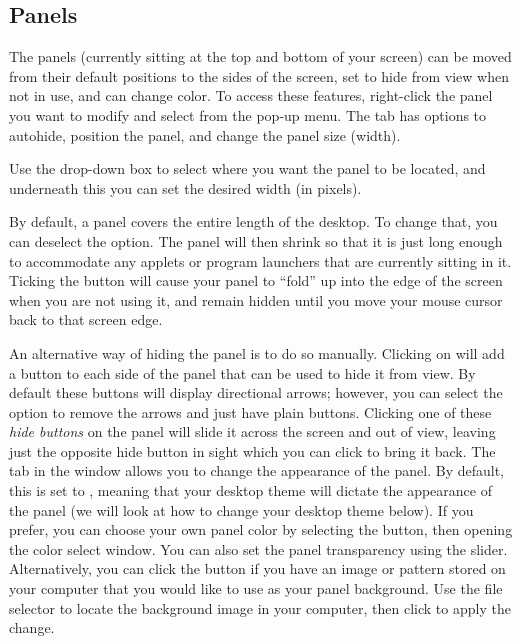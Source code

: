 \subsection{Panels}
The panels (currently sitting at the top and bottom of your screen) can be moved from their default positions to the sides of the screen, set to hide from view when not in use, and can change color. To access these features, right-click the panel you want to modify and select 
from the pop-up menu. The  tab has options to autohide, position the panel, and change the panel size (width). 

Use the  drop-down box to select where you want the panel to be located, and underneath this you can set the desired width (in pixels).

By default, a panel covers the entire length of the desktop. To change that, you can deselect the  option. The panel will then shrink so that it is just long enough to accommodate any applets or program launchers that are currently sitting in it. Ticking the  button will cause your panel to ``fold'' up into the edge of the screen when you are not using it, and remain hidden until you move your mouse cursor back to that screen edge. 

An alternative way of hiding the panel is to do so manually. Clicking on  will add a button to each side of the panel that can be used to hide it from view. By default these buttons will display directional arrows; however, you can select the  option to remove the arrows and just have plain buttons. Clicking one of these \emph{hide buttons} on the panel will slide it across the screen and out of view, leaving just the opposite hide button in sight which you can click to bring it back. 
The  tab in the  window allows you to change the appearance of the panel. By default, this is set to , meaning that your desktop theme will dictate the appearance of the panel (we will look at how to change your desktop theme below). If you prefer, you can choose your own panel color by selecting the  button, then opening the color select window. You can also set the panel transparency using the slider. Alternatively, you can click the  button if you have an image or pattern stored on your computer that you would like to use as your panel background. Use the file selector to locate the background image in your computer, then click  to apply the change. 

